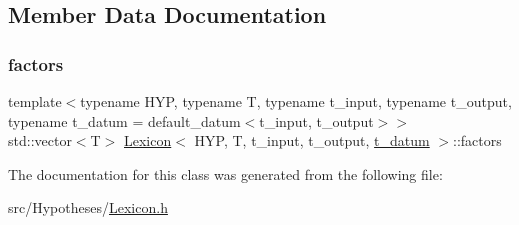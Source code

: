 \subsection{Member Data Documentation}
\mbox{\label{class_lexicon_a030dd03b0f892b4bda7f8bc6ff3fc7df}} 
\subsubsection{\texorpdfstring{factors}{factors}}
{\footnotesize\ttfamily template$<$typename H\+YP, typename T, typename t\+\_\+input, typename t\+\_\+output, typename t\+\_\+datum = default\+\_\+datum$<$t\+\_\+input, t\+\_\+output$>$$>$ \\
std\+::vector$<$T$>$ \hyperlink{class_lexicon}{Lexicon}$<$ H\+YP, T, t\+\_\+input, t\+\_\+output, \hyperlink{class_bayesable_a7c93a2eeab708378eb321745908718d4}{t\+\_\+datum} $>$\+::factors}



The documentation for this class was generated from the following file\+:\begin{DoxyCompactItemize}
\item 
src/\+Hypotheses/\hyperlink{_lexicon_8h}{Lexicon.\+h}\end{DoxyCompactItemize}
